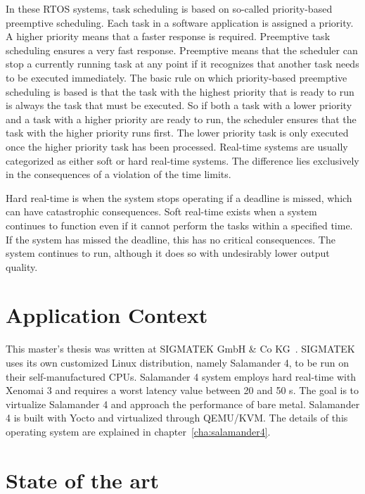 \documentclass[MMR,Master,english]{twbook}
\begin{document}
\bigskip \noindent In these RTOS systems, task scheduling is based on so-called priority-based preemptive scheduling. Each task in a software application is assigned a priority. A higher priority means that a faster response is required. Preemptive task scheduling ensures a very fast response. Preemptive means that the scheduler can stop a currently running task at any point if it recognizes that another task needs to be executed immediately. The basic rule on which priority-based preemptive scheduling is based is that the task with the highest priority that is ready to run is always the task that must be executed. So if both a task with a lower priority and a task with a higher priority are ready to run, the scheduler ensures that the task with the higher priority runs first. The lower priority task is only executed once the higher priority task has been processed. Real-time systems are usually categorized as either soft or hard real-time systems. The difference lies exclusively in the consequences of a violation of the time limits.

\bigskip \noindent Hard real-time is when the system stops operating if a deadline is missed, which can have catastrophic consequences. Soft real-time exists when a system continues to function even if it cannot perform the tasks within a specified time. If the system has missed the deadline, this has no critical consequences. The system continues to run, although it does so with undesirably lower output quality.

\clearpage
\section{Application Context}
This master's thesis was written at SIGMATEK GmbH \& Co KG~\cite{pixelartSIGMATEKKompletteAutomatisierungssysteme}.
SIGMATEK uses its own customized Linux distribution, namely Salamander 4, to be run on their self-manufactured CPUs. Salamander 4 system employs hard real-time with Xenomai 3 and requires a worst latency value between 20 and 50 \textmu s. The goal is to virtualize Salamander 4 and approach the performance of bare metal. Salamander 4 is built with Yocto and virtualized through QEMU/KVM. The details of this operating system are explained in chapter~\ref{cha:salamander4}. 

\section{State of the art}
\end{document}
